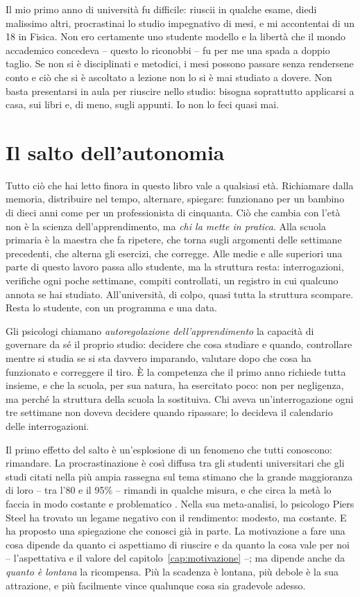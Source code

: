 Il mio primo anno di università fu difficile: riuscii in qualche esame, diedi malissimo altri, procrastinai lo studio impegnativo di mesi, e mi accontentai di un 18 in Fisica. Non ero certamente uno studente modello e la libertà che il mondo accademico concedeva -- questo lo riconobbi -- fu per me una spada a doppio taglio. Se non si è disciplinati e metodici, i mesi possono passare senza rendersene conto e ciò che si è ascoltato a lezione non lo si è mai studiato a dovere. Non basta presentarsi in aula per riuscire nello studio: bisogna soprattutto applicarsi a casa, sui libri e, di meno, sugli appunti. Io non lo feci quasi mai.

\section{Il salto dell'autonomia}

Tutto ciò che hai letto finora in questo libro vale a qualsiasi età.
Richiamare dalla memoria, distribuire nel tempo, alternare, spiegare:
funzionano per un bambino di dieci anni come per un professionista di
cinquanta. Ciò che cambia con l'età non è la scienza
dell'apprendimento, ma \emph{chi la mette in pratica}. Alla scuola
primaria è la maestra che fa ripetere, che torna sugli argomenti delle
settimane precedenti, che alterna gli esercizi, che corregge. Alle
medie e alle superiori una parte di questo lavoro passa allo studente,
ma la struttura resta: interrogazioni, verifiche ogni poche settimane,
compiti controllati, un registro in cui qualcuno annota se hai
studiato. All'università, di colpo, quasi tutta la struttura
scompare. Resta lo studente, con un programma e una data.

Gli psicologi chiamano \emph{autoregolazione dell'apprendimento} la
capacità di governare da sé il proprio studio: decidere che cosa
studiare e quando, controllare mentre si studia se si sta davvero
imparando, valutare dopo che cosa ha funzionato e correggere il tiro.
È la competenza che il primo anno richiede tutta insieme, e che la
scuola, per sua natura, ha esercitato poco: non per negligenza, ma
perché la struttura della scuola la sostituiva. Chi aveva
un'interrogazione ogni tre settimane non doveva decidere quando
ripassare; lo decideva il calendario delle interrogazioni.

Il primo effetto del salto è un'esplosione di un fenomeno che tutti
conoscono: rimandare. La procrastinazione è così diffusa tra gli
studenti universitari che gli studi citati nella più ampia rassegna
sul tema stimano che la grande maggioranza di loro -- tra l'80 e il
95\% -- rimandi in qualche misura, e che circa la metà lo faccia in
modo costante e problematico \parencite{steel2007}. Nella sua
meta-analisi, lo psicologo Piers Steel ha trovato un legame negativo
con il rendimento: modesto, ma costante. E ha proposto una spiegazione
che conosci già in parte. La motivazione a fare una cosa dipende da
quanto ci aspettiamo di riuscire e da quanto la cosa vale per noi --
l'aspettativa e il valore del capitolo~\ref{cap:motivazione} --; ma
dipende anche da \emph{quanto è lontana} la ricompensa. Più la scadenza
è lontana, più debole è la sua attrazione, e più facilmente vince
qualunque cosa sia gradevole adesso.

